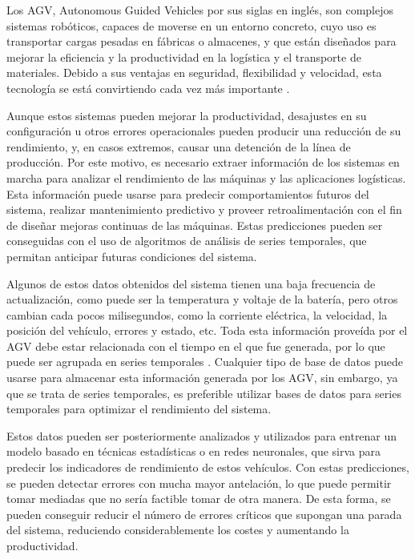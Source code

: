 

Los AGV, Autonomous Guided Vehicles por sus siglas en inglés, son complejos sistemas robóticos, 
capaces de moverse en un entorno concreto, cuyo uso es transportar cargas pesadas en fábricas o 
almacenes, y que están diseñados para mejorar la eficiencia y la productividad en la logística 
y el transporte de materiales. Debido a sus ventajas en seguridad, flexibilidad y velocidad,
esta tecnología se está convirtiendo cada vez más importante \cite{espinosa2020transporte}.

Aunque estos sistemas pueden mejorar la productividad, desajustes en su configuración u otros
errores operacionales pueden producir una reducción de su rendimiento, y, en casos extremos,
causar una detención de la línea de producción. Por este motivo, es necesario extraer información
de los sistemas en marcha para analizar el rendimiento de las máquinas y las aplicaciones logísticas.
Esta información puede usarse para predecir comportamientos futuros del sistema, realizar mantenimiento
predictivo y proveer retroalimentación con el fin de diseñar mejoras continuas de las máquinas. Estas
predicciones pueden ser conseguidas con el uso de algoritmos de análisis de series temporales, que
permitan anticipar futuras condiciones del sistema. \cite{BARUQUE201949}

Algunos de estos datos obtenidos del sistema tienen una baja frecuencia de actualización, como puede
ser la temperatura y voltaje de la batería, pero otros cambian cada pocos milisegundos, como la
corriente eléctrica, la velocidad, la posición del vehículo, errores y estado, etc. Toda esta
información proveída por el AGV debe estar relacionada con el tiempo en el que fue generada, por
lo que puede ser agrupada en series temporales \cite{DBLP:journals/corr/abs-2104-00164}. Cualquier
tipo de base de datos puede usarse para almacenar esta información generada por los AGV, sin embargo,
ya que se trata de series temporales, es preferible utilizar bases de datos para series temporales
para optimizar el rendimiento del sistema.

Estos datos pueden ser posteriormente analizados y utilizados para entrenar un modelo basado en técnicas 
estadísticas o en redes neuronales, que sirva para predecir los indicadores de rendimiento de estos vehículos.
Con estas predicciones, se pueden detectar errores con mucha mayor antelación, lo que puede permitir tomar 
mediadas que no sería factible tomar de otra manera. De esta forma, se pueden conseguir reducir el número 
de errores críticos que supongan una parada del sistema, reduciendo considerablemente los costes y aumentando 
la productividad.

